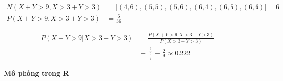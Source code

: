 \documentclass[a4paper,12pt]{article}
\begin{document}
\begin{enumerate}[label=\alph*)]
	\begin{align*}
		N(X+Y > 9, X > 3 + Y > 3) &= |{(4, 6), (5, 5), (5,6), (6,4), (6,5), (6,6)}| = 6 \\
		P(X+Y > 9, X > 3 + Y > 3) &= \frac{6}{36}
	\end{align*}
	
	\begin{align*}
		P(X + Y > 9 | X>3 + Y>3) &= \frac{P(X+Y > 9, X > 3 + Y > 3)}{P(X > 3 + Y > 3)} \\
		&= \displaystyle{\frac{\frac{6}{36}}{\frac{3}{4}}} = \frac{2}{9} \approx 0.222
	\end{align*}
	
\end{enumerate}

{\large\textbf{Mô phỏng trong R}} \\
\end{document}
